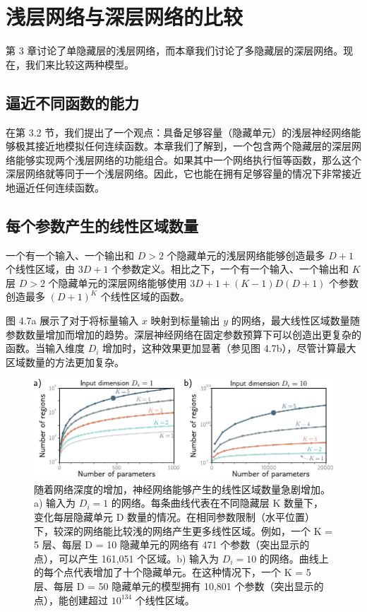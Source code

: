 \documentclass[lang=cn,newtx,10pt,scheme=chinese]{elegantbook}
\begin{document}
\section{浅层网络与深层网络的比较}
第 3 章讨论了单隐藏层的浅层网络，而本章我们讨论了多隐藏层的深层网络。现在，我们来比较这两种模型。

\subsection{逼近不同函数的能力}
在第 3.2 节，我们提出了一个观点：具备足够容量（隐藏单元）的浅层神经网络能够极其接近地模拟任何连续函数。本章我们了解到，一个包含两个隐藏层的深层网络能够实现两个浅层网络的功能组合。如果其中一个网络执行恒等函数，那么这个深层网络就等同于一个浅层网络。因此，它也能在拥有足够容量的情况下非常接近地逼近任何连续函数。

\subsection{每个参数产生的线性区域数量}
一个有一个输入、一个输出和 \(D > 2\) 个隐藏单元的浅层网络能够创造最多 \(D + 1\) 个线性区域，由 \(3D + 1\) 个参数定义。相比之下，一个有一个输入、一个输出和 \(K\) 层 \(D > 2\) 个隐藏单元的深层网络能够使用 \(3D + 1 + (K - 1)D(D + 1)\) 个参数创造最多 \((D + 1)^K\) 个线性区域的函数。

图 4.7a 展示了对于将标量输入 \(x\) 映射到标量输出 \(y\) 的网络，最大线性区域数量随参数数量增加而增加的趋势。深层神经网络在固定参数预算下可以创造出更复杂的函数。当输入维度 \(D_i\) 增加时，这种效果更加显著（参见图 4.7b），尽管计算最大区域数量的方法更加复杂。

\begin{figure}[ht!]
	\centering
	\includegraphics[width=0.7\linewidth]{PDFFigures/UDLChap4PDF/DeepParams.pdf}
	\caption{随着网络深度的增加，神经网络能够产生的线性区域数量急剧增加。a) 输入为 \(D_i = 1\) 的网络。每条曲线代表在不同隐藏层 K 数量下，变化每层隐藏单元 D 数量的情况。在相同参数限制（水平位置）下，较深的网络能比较浅的网络产生更多线性区域。例如，一个 K = 5 层、每层 D = 10 隐藏单元的网络有 471 个参数（突出显示的点），可以产生 161,051 个区域。b) 输入为 \(D_i = 10\) 的网络。曲线上的每个点代表增加了十个隐藏单元。在这种情况下，一个 K = 5 层、每层 D = 50 隐藏单元的模型拥有 10,801 个参数（突出显示的点），能创建超过 $10^134$ 个线性区域。}
\end{figure}
\end{document}
